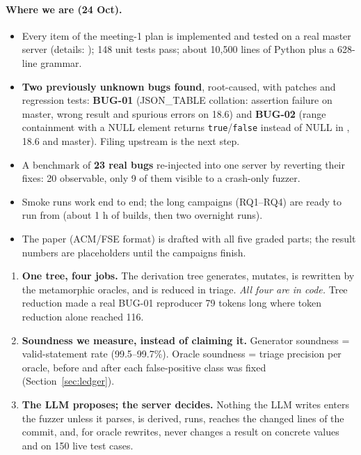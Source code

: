 \paragraph{Where we are (24 Oct).}
\begin{itemize}
  \item Every item of the meeting-1 plan is implemented and tested on a real
    \pg master server (details: ); 148 unit tests pass;
    about 10{,}500 lines of Python plus a 628-line grammar.
  \item \textbf{Two previously unknown \pg bugs found}, root-caused, with
    patches and regression tests: \textbf{BUG-01} (JSON\_TABLE collation:
    assertion failure on master, wrong result and spurious errors on 18.6) and
    \textbf{BUG-02} (range containment with a NULL element returns
    \texttt{true}/\texttt{false} instead of NULL in , 18.6 and master).
    Filing upstream is the next step.
  \item A benchmark of \textbf{23 real bugs} re-injected into one server by
    reverting their fixes: 20 observable, only 9 of them visible to a
    crash-only fuzzer.
  \item Smoke runs work end to end; the long campaigns (RQ1--RQ4) are ready to
    run from  (about 1 h of builds, then two
    overnight runs).
  \item The paper (ACM/FSE format) is drafted with all five graded parts;
    the result numbers are placeholders until the campaigns finish.
\end{itemize}

\begin{keybox}
\begin{enumerate}
  \item \textbf{One tree, four jobs.} The derivation tree generates, mutates,
    is rewritten by the metamorphic oracles, and is reduced in triage.
    \emph{All four are in code.} Tree reduction made a real BUG-01 reproducer
    79 tokens long where token reduction alone reached 116.
  \item \textbf{Soundness we measure, instead of claiming it.} Generator
    soundness = valid-statement rate (99.5--99.7\%). Oracle soundness =
    triage precision per oracle, before and after each false-positive class was
    fixed (Section~\ref{sec:ledger}).
  \item \textbf{The LLM proposes; the server decides.} Nothing the LLM writes
    enters the fuzzer unless it parses, is derived, runs, reaches the changed
    lines of the commit, and, for oracle rewrites, never changes a result on
    concrete values and on 150 live test cases.
\end{enumerate}
\end{keybox}

